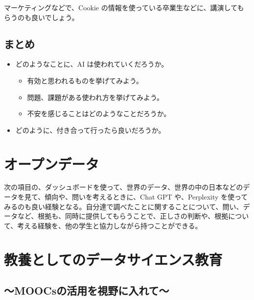 \documentclass[
]{bxjsbook}
\providecommand{\tightlist}{%
  \setlength{\itemsep}{0pt}\setlength{\parskip}{0pt}}
\theoremstyle{definition}
\theoremstyle{definition}
\theoremstyle{definition}
\theoremstyle{definition}
\theoremstyle{remark}
\begin{document}
マーケティングなどで、Cookie の情報を使っている卒業生などに、講演してもらうのも良いでしょう。

\hypertarget{ux307eux3068ux3081}{%
\subsection{まとめ}\label{ux307eux3068ux3081}}

\begin{itemize}
\tightlist
\item
  どのようなことに、AI は使われていくだろうか。

  \begin{itemize}
  \tightlist
  \item
    有効と思われるものを挙げてみよう。
  \item
    問題、課題がある使われ方を挙げてみよう。
  \item
    不安を感じることはどのようなことだろうか。
  \end{itemize}
\item
  どのように、付き合って行ったら良いだろうか。
\end{itemize}

\hypertarget{opendata}{%
\section{オープンデータ　}\label{opendata}}

次の項目の、ダッシュボードを使って、世界のデータ、世界の中の日本などのデータを見て、傾向や、問いを考えるときに、Chat GPT や、Perplexity を使ってみるのも良い経験となる。自分達で調べたことに関することについて、問い、データなど、根拠も、同時に提供してもらうことで、正しさの判断や、根拠について、考える経験を、他の学生と協力しながら持つことができる。

\hypertarget{appendix-appendix}{%
\appendix}


\hypertarget{math2019}{%
\section{教養としてのデータサイエンス教育}\label{math2019}}

\hypertarget{moocsux306eux6d3bux7528ux3092ux8996ux91ceux306bux5165ux308cux3066}{%
\subsection*{～MOOCsの活用を視野に入れて～}\label{moocsux306eux6d3bux7528ux3092ux8996ux91ceux306bux5165ux308cux3066}}
\end{document}
